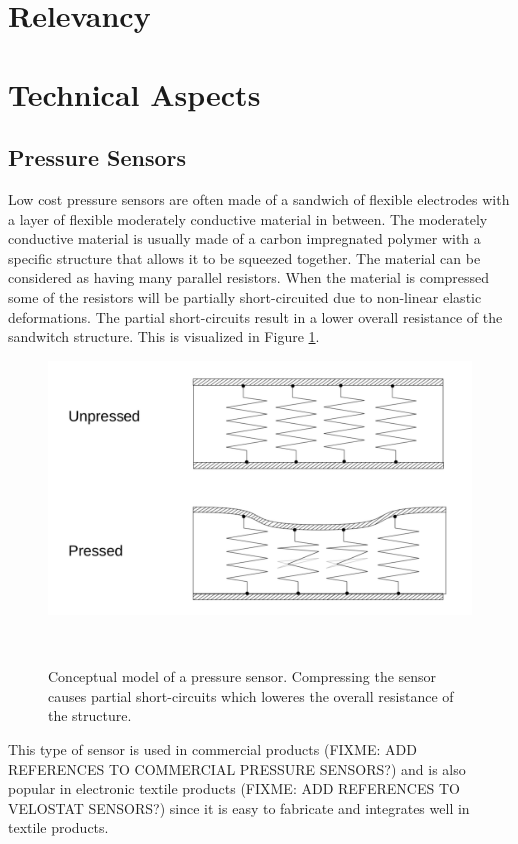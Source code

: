 \documentclass{sigchi}
\begin{document}
\section{Relevancy}

\section{Technical Aspects}
\subsection{Pressure Sensors}
Low cost pressure sensors are often made of a sandwich of flexible electrodes
with a layer of flexible moderately conductive material in between. The
moderately conductive material is usually made of a carbon impregnated polymer
with a specific structure that allows it to be squeezed together. The material
can be considered as having many parallel resistors. When the material is
compressed some of the resistors will be partially short-circuited due to
non-linear elastic deformations. The partial short-circuits result in a lower
overall resistance of the sandwitch structure. This is visualized
in Figure \ref{fig:pressure_sensor}.

\begin{figure}
\centering
  \includegraphics[width=0.9\columnwidth]{figures/resistive_sensor}
  \caption{Conceptual model of a pressure sensor. Compressing the sensor causes
  partial short-circuits which loweres the overall resistance of the
  structure.}~\label{fig:pressure_sensor}
\end{figure}

This type of sensor is used in commercial products (FIXME: ADD REFERENCES TO
COMMERCIAL PRESSURE SENSORS?) and is also popular in electronic textile products
(FIXME: ADD REFERENCES TO VELOSTAT SENSORS?) since it is easy to fabricate and
integrates well in textile products.
\end{document}
